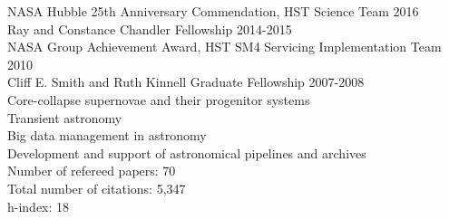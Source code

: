 \documentclass[10pt]{cv}
\begin{document}
\begin{llist}
\vspace{-0.2in}   
NASA Hubble 25th Anniversary Commendation, HST Science Team \hfill 2016 \\ %
Ray and Constance Chandler Fellowship \hfill 2014-2015 \\ %
NASA Group Achievement Award, HST SM4 Servicing Implementation Team \hfill2010 \\
Cliff E. Smith and Ruth Kinnell Graduate Fellowship \hfill 2007-2008\\ %
\vspace{-0.2in}   
Core-collapse supernovae and their progenitor systems\\
Transient astronomy\\
Big data management in astronomy\\
Development and support of astronomical pipelines and archives\\ 
\vspace{-0.2in}   
Number of refereed papers: 70\\
Total number of citations: 5,347\\
h-index: 18\\

\end{llist}
\end{document}
